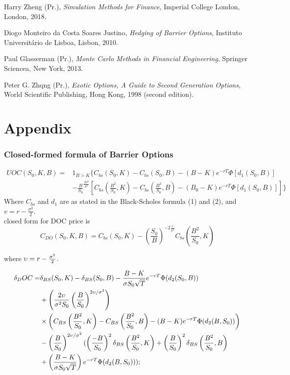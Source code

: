 \documentclass[11pt,a4paper,fleqn,draft]{article}
\begin{document}
\begin{thebibliography}{9}

Harry Zheng (Pr.),
  \textit{Simulation Methods for Finance},
  Imperial College London, London,
  2018.

Diogo Monteiro da Costa Soares Justino,
  \textit{Hedging of Barrier Options},
  Instituto Universit\'ario de Lisboa, Lisbon,
  2010.

Paul Glasserman (Pr.),
  \textit{Monte Carlo Methods in Financial Engineering},
  Springer Sciencea, New York,
  2013.

Peter G. Zhqng (Pr.),
  \textit{Exotic Options, A Guide to Second Generation Options},
  World Scientific Publishing, Hong Kong,
  1998 (second edition).


\end{thebibliography}
\newpage

\part*{Appendix}
\appendix
\section{Closed-formed formula of Barrier Options}
\label{sec:bocomp}
\begin{equation}
\begin{aligned}
UOC(S_0,K,B) ={} &1_{B>K} \{ C_{bs}(S_0, K)-C_{bs}(S_0,B)-(B-K)e^{-rT}\Phi[d_{1}(S_0,B)] \\
      & -\frac{B}{S_0}^{\frac{2v^2}{\sigma^2}}\left[C_{bs}(\frac{B^2}{S_0}, K)-C_{bs}(\frac{B^2}{S_0}, B) -(B_0-K)e^{-rT}\Phi[d_{1}(S_0,B)]\right]\}
\end{aligned}
\end{equation}
Where $C_{bs}$ and $d_{1}$ are as stated in the Black-Scholes formula (1) and (2), and $v=r-\frac{\sigma^2}{2}$.\\

closed form for DOC price is
$$C_{DO}(S_0,K,B) = C_{bs}(S_0, K) -  (\frac{S_0}{B})^{ -2\frac{\upsilon}{\sigma^2}}C_{bs}(\frac{B^2}{S_0}, K)$$

where $\upsilon = r - {\sigma^2 \over 2}$.

\begin{align*}
\delta_DOC =& \delta_{BS}(S_0, K) - \delta_{BS}(S_0, B)-{B - K\over \sigma S_0 \sqrt{T}}e^{-rT}\Phi(d_2(S_0,B))\\
&+ \left({2\upsilon\over \sigma^2 S_0} \left({B \over S_0}\right)^{ 2\upsilon / \sigma^2} \right)\\
&\times \left(C_{BS}\left({B^2 \over S_0}, K\right) - C_{BS}\left({B^2\over S_0}, B\right) - (B - K)e^{-rT}\Phi(d_2(B, S_0))\right)\\
&-\left({B \over S_0}\right)^{ 2\upsilon / \sigma^2}(\left({-B \over S_0}\right)^2\delta_{BS}\left({B^2 \over S_0}, K\right) + \left({B\over S_0}\right)^2\delta_{BS}\left({B^2 \over S_0}, B\right)\\
&+ \left({B - K \over \sigma S_0\sqrt{T}}\right)e^{-rT}\Phi(d_2(B, S_0)));
\end{align*}
\end{document}
